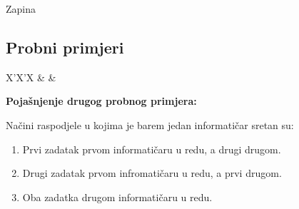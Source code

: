 \begin{statement}[
  problempoints=110,
  timelimit=1 sekunda,
  memorylimit=512 MiB,
]{Zapina}
\subsection*{Probni primjeri}
\begin{tabularx}{\textwidth}{X'X'X}
 &
 &
\end{tabularx}

\textbf{Pojašnjenje drugog probnog primjera:}

Načini raspodjele u kojima je barem jedan informatičar sretan su:
\begin{enumerate}
  \item Prvi zadatak prvom informatičaru u redu, a drugi drugom.
  \item Drugi zadatak prvom infromatičaru u redu, a prvi drugom.
  \item Oba zadatka drugom informatičaru u redu.
\end{enumerate}

\end{statement}

